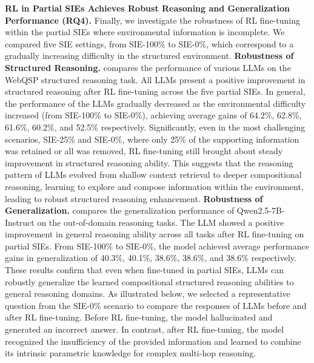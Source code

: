\documentclass{article} %
\begin{document}
\textbf{RL in Partial SIEs Achieves Robust Reasoning and Generalization Performance (RQ4).} 
Finally, we investigate the robustness of RL fine-tuning within the partial SIEs where environmental information is incomplete. We compared five SIE settings, from SIE-100\% to SIE-0\%, which correspond to a gradually increasing difficulty in the structured environment. 
\textbf{Robustness of Structured Reasoning.}  compares the performance of various LLMs on the WebQSP structured reasoning task. 
All LLMs present a positive improvement in structured reasoning after RL fine-tuning across the five partial SIEs. 
In general, the performance of the LLMs gradually decreased as the environmental difficulty increased (from SIE-100\% to SIE-0\%), achieving average gains of 64.2\%, 62.8\%, 61.6\%, 60.2\%, and 52.5\% respectively. 
Significantly, even in the most challenging scenarios, SIE-25\% and SIE-0\%, where only 25\% of the supporting information was retained or all was removed, RL fine-tuning still brought about steady improvement in structured reasoning ability. This suggests that the reasoning pattern of LLMs evolved from shallow context retrieval to deeper compositional reasoning, learning to explore and compose information within the environment, leading to robust structured reasoning enhancement. 
\textbf{Robustness of Generalization.}  compares the generalization performance of Qwen2.5-7B-Instruct on the out-of-domain reasoning tasks.  
The LLM showed a positive improvement in general reasoning ability across all tasks after RL fine-tuning on partial SIEs.  
From SIE-100\% to SIE-0\%, the model achieved average performance gains in generalization of 40.3\%, 40.1\%, 38.6\%, 38.6\%, and 38.6\% respectively. 
These results confirm that even when fine-tuned in partial SIEs, LLMs can robustly generalize the learned compositional structured reasoning abilities to general reasoning domains. As illustrated below, we selected a representative question from the SIE-0\% scenario to compare the responses of LLMs before and after RL fine-tuning. Before RL fine-tuning, the model hallucinated and generated an incorrect answer. In contrast, after RL fine-tuning, the model recognized the insufficiency of the provided information and learned to combine its intrinsic parametric knowledge for complex multi-hop reasoning.
\end{document}
